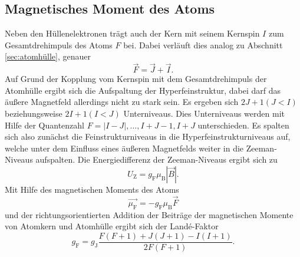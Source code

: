 \subsection{Magnetisches Moment des Atoms}
\label{sec:atom}
Neben den Hüllenelektronen trägt auch der Kern mit seinem Kernspin $I$ zum Gesamtdrehimpuls des Atoms $F$ bei.
Dabei verläuft dies analog zu Abschnitt \ref{sec:atomhülle}, genauer
\begin{equation*}
  \vec{F} = \vec{J} + \vec{I}.
\end{equation*}
Auf Grund der Kopplung vom Kernspin mit dem Gesamtdrehimpuls der Atomhülle ergibt sich die Aufspaltung der 
Hyperfeinstruktur, dabei darf das äußere Magnetfeld allerdings nicht zu stark sein.
Es ergeben sich $2J+1 (J<I)$ beziehungsweise $2I+1 (I<J)$  Unterniveaus. Dies Unterniveaus werden mit Hilfe
der Quantenzahl $F = |I-J|, \ldots,I+J-1, I+J$ unterschieden. Es spalten sich also zunächst die Feinstrukturniveaus
in die Hyperfeinstrukturniveaus auf, welche unter dem Einfluss eines äußeren Magnetfelds weiter in die 
Zeeman-Niveaus aufspalten. Die Energiedifferenz der Zeeman-Niveaus ergibt sich zu
\begin{equation}
  \label{eqn:zeeman}
  U_\text{Z} = g_\text{F} \mu_\text{B} |\vec{B}|.
\end{equation}
Mit Hilfe des magnetischen Moments des Atoms
\begin{equation*}
  \vec{\mu_\text{F}} = -g_\text{F} \mu_\text{B} \vec{F}
\end{equation*}
und der richtungsorientierten Addition der Beiträge der magnetischen Momente von Atomkern und Atomhülle
ergibt sich der Landé-Faktor
\begin{equation}
  \label{eqn:lande}
  g_\text{F} = g_\text{J} \frac{F(F+1)+J(J+1)-I(I+1)}{2F(F+1)}.
\end{equation}

